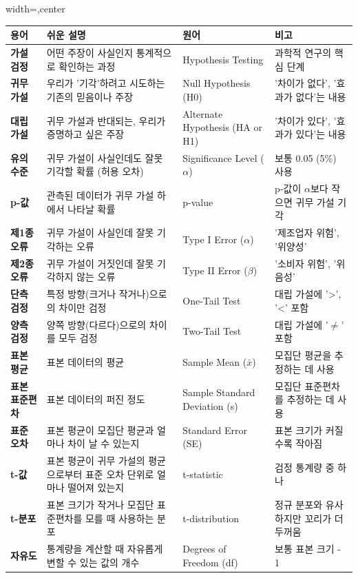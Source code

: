 \documentclass[11pt,a4paper]{article}
\theoremstyle{definition}
\begin{document}
\begin{adjustbox}{width=\textwidth,center}
\begin{tabular}{llll}
\toprule
\textbf{용어} & \textbf{쉬운 설명} & \textbf{원어} & \textbf{비고} \\
\midrule
\textbf{가설 검정} & 어떤 주장이 사실인지 통계적으로 확인하는 과정 & Hypothesis Testing & 과학적 연구의 핵심 단계 \\
\textbf{귀무 가설} & 우리가 '기각'하려고 시도하는 기존의 믿음이나 주장 & Null Hypothesis (H0) & '차이가 없다', '효과가 없다'는 내용 \\
\textbf{대립 가설} & 귀무 가설과 반대되는, 우리가 증명하고 싶은 주장 & Alternate Hypothesis (HA or H1) & '차이가 있다', '효과가 있다'는 내용 \\
\textbf{유의 수준} & 귀무 가설이 사실인데도 잘못 기각할 확률 (허용 오차) & Significance Level ($\alpha$) & 보통 0.05 (5\%) 사용 \\
\textbf{p-값} & 관측된 데이터가 귀무 가설 하에서 나타날 확률 & p-value & p-값이 $\alpha$보다 작으면 귀무 가설 기각 \\
\textbf{제1종 오류} & 귀무 가설이 사실인데 잘못 기각하는 오류 & Type I Error ($\alpha$) & '제조업자 위험', '위양성' \\
\textbf{제2종 오류} & 귀무 가설이 거짓인데 잘못 기각하지 않는 오류 & Type II Error ($\beta$) & '소비자 위험', '위음성' \\
\textbf{단측 검정} & 특정 방향(크거나 작거나)으로의 차이만 검정 & One-Tail Test & 대립 가설에 '>', '<' 포함 \\
\textbf{양측 검정} & 양쪽 방향(다르다)으로의 차이를 모두 검정 & Two-Tail Test & 대립 가설에 '$\ne$' 포함 \\
\textbf{표본 평균} & 표본 데이터의 평균 & Sample Mean ($\bar{x}$) & 모집단 평균을 추정하는 데 사용 \\
\textbf{표본 표준편차} & 표본 데이터의 퍼진 정도 & Sample Standard Deviation (s) & 모집단 표준편차를 추정하는 데 사용 \\
\textbf{표준 오차} & 표본 평균이 모집단 평균과 얼마나 차이 날 수 있는지 & Standard Error (SE) & 표본 크기가 커질수록 작아짐 \\
\textbf{t-값} & 표본 평균이 귀무 가설의 평균으로부터 표준 오차 단위로 얼마나 떨어져 있는지 & t-statistic & 검정 통계량 중 하나 \\
\textbf{t-분포} & 표본 크기가 작거나 모집단 표준편차를 모를 때 사용하는 분포 & t-distribution & 정규 분포와 유사하지만 꼬리가 더 두꺼움 \\
\textbf{자유도} & 통계량을 계산할 때 자유롭게 변할 수 있는 값의 개수 & Degrees of Freedom (df) & 보통 표본 크기 - 1 \\
\bottomrule
\end{tabular}
\end{adjustbox}
\label{tab:glossary}
\end{document}

